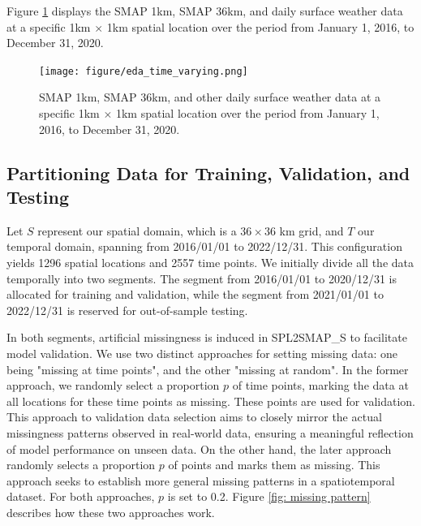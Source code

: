 \documentclass[11pt]{article}
\begin{document}
Figure \ref{fig: eda_time_varying} displays the SMAP 1km, SMAP 36km, and daily surface weather data at a specific 1km $\times$ 1km spatial location over the period from January 1, 2016, to December 31, 2020. 

\begin{figure}[H]
\centering
\texttt{[image: figure/eda\_time\_varying.png]}
\caption{SMAP 1km, SMAP 36km, and other daily surface weather data at a specific 1km $\times$ 1km spatial location over the period from January 1, 2016, to December 31, 2020.}
\label{fig: eda_time_varying}
\end{figure}










\subsection{Partitioning Data for Training, Validation, and Testing}
Let $S$ represent our spatial domain, which is a \(36 \times 36\) km grid, and $T$ our temporal domain, spanning from 2016/01/01 to 2022/12/31.
This configuration yields 1296 spatial locations and 2557 time points. We initially divide all the data temporally into two segments. The segment from 2016/01/01 to 2020/12/31 is allocated for training and validation, while the segment from 2021/01/01 to 2022/12/31 is reserved for out-of-sample testing.

In both segments, artificial missingness is induced in SPL2SMAP\_S to facilitate model validation.  We use two distinct approaches for setting missing data: one being "missing at time points", and the other "missing at random". In the former approach, we randomly select a proportion $p$ of time points, marking the data at all locations for these time points as missing. These points are used for validation. This approach to validation data selection aims to closely mirror the actual missingness patterns observed in real-world data, ensuring a meaningful reflection of model performance on unseen data. On the other hand, the later approach randomly selects a proportion $p$ of points and marks them as missing. This approach seeks to establish more general missing patterns in a spatiotemporal dataset. For both approaches, $p$ is set to 0.2. Figure \ref{fig: missing pattern} describes how these two approaches work.
\end{document}
